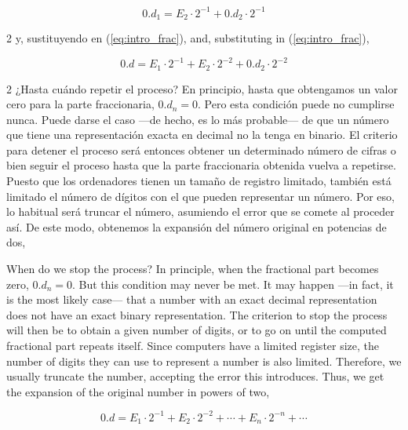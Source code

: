\begin{equation}
0.d_1=E_2\cdot 2^{-1}+0.d_2\cdot 2^{-1}
\end{equation}
\begin{paracol}{2}
y, sustituyendo en (\ref{eq:intro_frac}),
\switchcolumn
and, substituting in (\ref{eq:intro_frac}),
\end{paracol}
\begin{equation}
0.d=E_1\cdot 2^{-1}+E_2\cdot 2^{-2}+0.d_2\cdot 2^{-2}
\end{equation}
\begin{paracol}{2}
¿Hasta cuándo repetir el proceso? En principio, hasta que obtengamos un valor cero para la parte fraccionaria, $0.d_n=0$. Pero esta condición puede no cumplirse nunca. Puede darse el caso ---de hecho, es lo más probable--- de que un número que tiene una representación exacta en decimal no la tenga en binario. El criterio para detener el proceso será entonces obtener un determinado número de cifras o bien seguir el proceso hasta que la parte fraccionaria obtenida vuelva a repetirse. Puesto que los ordenadores tienen un tamaño de registro limitado, también está limitado el número de dígitos con el que pueden representar un número. Por eso, lo habitual será truncar el número, asumiendo el error que se comete al proceder así. De este modo, obtenemos la expansión del número original en potencias de dos,

\switchcolumn
When do we stop the process? In principle, when the fractional part becomes zero, $0.d_n = 0$. But this condition may never be met. It may happen ---in fact, it is the most likely case--- that a number with an exact decimal representation does not have an exact binary representation. The criterion to stop the process will then be to obtain a given number of digits, or to go on until the computed fractional part repeats itself. Since computers have a limited register size, the number of digits they can use to represent a number is also limited. Therefore, we usually truncate the number, accepting the error this introduces. Thus, we get the expansion of the original number in powers of two,
\end{paracol}
\begin{equation}
0.d=E_1\cdot 2^{-1}+E_2\cdot 2^{-2}+\cdots+ E_n\cdot 2^{-n}+\cdots
\end{equation}
